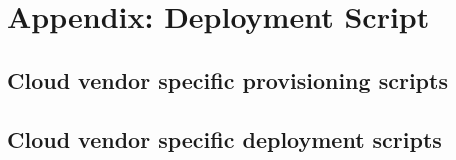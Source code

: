  
\chapter[Appendix: Deployment Script]{Appendix: Deployment Script}\label{app:deploy}




\section{Cloud vendor specific provisioning scripts}\label{app:deploy1}










\section{Cloud vendor specific deployment scripts}\label{app:deploy2}














